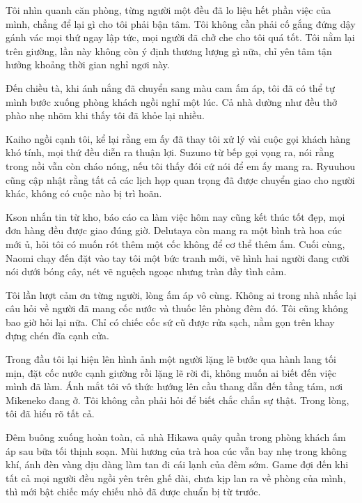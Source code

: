 \documentclass[../main.tex]{subfiles}
\begin{document}
Tôi nhìn quanh căn phòng, từng người một đều đã lo liệu hết phần việc của mình, chẳng để lại gì cho tôi phải bận tâm. Tôi không cần phải cố gắng đứng dậy gánh vác mọi thứ ngay lập tức, mọi người đã chở che cho tôi quá tốt. Tôi nằm lại trên giường, lần này không còn ý định thương lượng gì nữa, chỉ yên tâm tận hưởng khoảng thời gian nghỉ ngơi này.

\ct

Đến chiều tà, khi ánh nắng đã chuyển sang màu cam ấm áp, tôi đã có thể tự mình bước xuống phòng khách ngồi nghỉ một lúc. Cả nhà dường như đều thở phào nhẹ nhõm khi thấy tôi đã khỏe lại nhiều.

Kaiho ngồi cạnh tôi, kể lại rằng em ấy đã thay tôi xử lý vài cuộc gọi khách hàng khó tính, mọi thứ đều diễn ra thuận lợi. Suzuno từ bếp gọi vọng ra, nói rằng trong nồi vẫn còn cháo nóng, nếu tôi thấy đói cứ nói để em ấy mang ra. Ryuuhou cũng cập nhật rằng tất cả các lịch họp quan trọng đã được chuyển giao cho người khác, không có cuộc nào bị trì hoãn.

Kson nhắn tin từ kho, báo cáo ca làm việc hôm nay cũng kết thúc tốt đẹp, mọi đơn hàng đều được giao đúng giờ. Delutaya còn mang ra một bình trà hoa cúc mới ủ, hỏi tôi có muốn rót thêm một cốc không để cơ thể thêm ấm. Cuối cùng, Naomi chạy đến đặt vào tay tôi một bức tranh mới, vẽ hình hai người đang cười nói dưới bóng cây, nét vẽ nguệch ngoạc nhưng tràn đầy tình cảm.

Tôi lần lượt cảm ơn từng người, lòng ấm áp vô cùng. Không ai trong nhà nhắc lại câu hỏi về người đã mang cốc nước và thuốc lên phòng đêm đó. Tôi cũng không bao giờ hỏi lại nữa. Chỉ có chiếc cốc sứ cũ được rửa sạch, nằm gọn trên khay đựng chén đĩa cạnh cửa.

Trong đầu tôi lại hiện lên hình ảnh một người lặng lẽ bước qua hành lang tối mịn, đặt cốc nước cạnh giường rồi lặng lẽ rời đi, không muốn ai biết đến việc mình đã làm. Ánh mắt tôi vô thức hướng lên cầu thang dẫn đến tầng tám, nơi Mikeneko đang ở. Tôi không cần phải hỏi để biết chắc chắn sự thật. Trong lòng, tôi đã hiểu rõ tất cả.

\omk

Đêm buông xuống hoàn toàn, cả nhà Hikawa quây quần trong phòng khách ấm áp sau bữa tối thịnh soạn. Mùi hương của trà hoa cúc vẫn bay nhẹ trong không khí, ánh đèn vàng dịu dàng làm tan đi cái lạnh của đêm sớm. Game đợi đến khi tất cả mọi người đều ngồi yên trên ghế dài, chưa kịp lan ra về phòng của mình, thì mới bật chiếc máy chiếu nhỏ đã được chuẩn bị từ trước.
\end{document}
